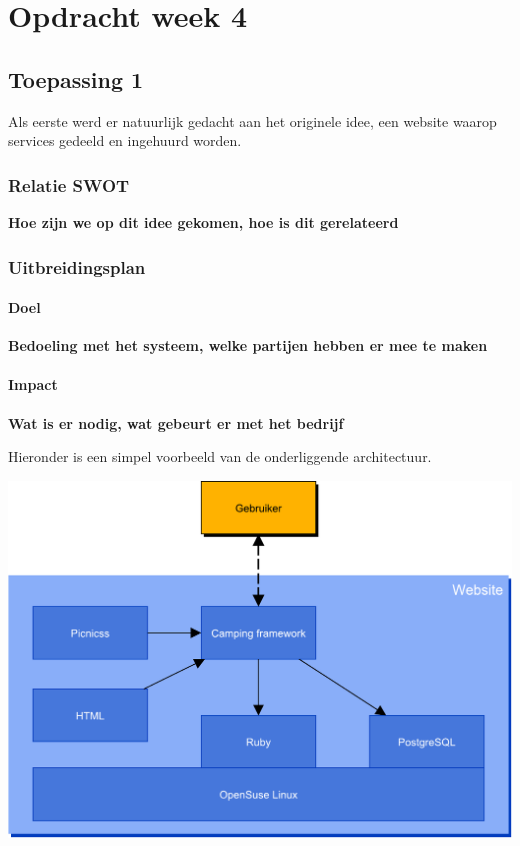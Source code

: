 \chapter{Opdracht week 4}

\section{Toepassing 1}

Als eerste werd er natuurlijk gedacht aan het originele idee,
een website waarop services gedeeld en ingehuurd worden.

\subsection{Relatie SWOT}
{\bf Hoe zijn we op dit idee gekomen, hoe is dit gerelateerd}

\subsection{Uitbreidingsplan}

\subsubsection{Doel}
{\bf Bedoeling met het systeem, welke partijen hebben er mee te maken}

\subsubsection{Impact}
{\bf Wat is er nodig, wat gebeurt er met het bedrijf}

Hieronder is een simpel voorbeeld van de onderliggende architectuur.

\includegraphics[width=\textwidth]{img/websiteArchitecture}

